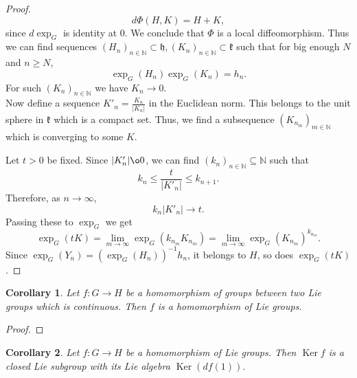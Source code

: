 \documentclass{article}
\newtheorem{corollary}{Corollary}[section]
\numberwithin{equation}{section}
\DeclareMathOperator{\Ker}{Ker}
\begin{document}
\begin{proof}
\begin{equation*}
d\Phi(H,K) = H+K,
\end{equation*}
since $d\exp_G$ is identity at $0$. We conclude that $\Phi$ is a local diffeomorphism. Thus we can find sequences $(H_n)_{n\in\mathbb{N}}\subset\mathfrak{h} ,(K_n)_{n\in\mathbb{N}}\subset\mathfrak{k}$ such that for big enough $N$ and $n\geq N$,
\begin{equation*}
\exp_G(H_n)\exp_G(K_n) = h_n.
\end{equation*}
For such $(K_n)_{n\in\mathbb{N}}$ we have $K_n\to 0$.\\%
Now define a sequence $K'_n = {\frac {K_n} {|K_n|}}$ in the Euclidean norm. This belongs to the unit sphere in $\mathfrak{k}$ which is a compact set. Thus, we find a subsequence $(K_{n_m})_{m\in\mathbb{N}}$ which is converging to some $K$.
\par Let $t>0$ be fixed. Since $|K'_n|\o 0$, we can find $(k_n)_{n\in\mathbb{N}}\subseteq\mathbb{N}$ such that
\begin{equation*}
k_n\leq {\frac t {|K'_n|}}\leq k_{n+1}.
\end{equation*}
Therefore, as $n\to\infty$, 
\begin{equation*}
k_n|K'_n|\to t.
\end{equation*}
Passing these to $\exp_G$ we get
\begin{equation*}
\exp_G(tK) = \lim_{m\to\infty}\exp_G(k_{n_m}K_{n_m}) = \lim_{m\to\infty}\exp_G(K_{n_m})^{k_{n_m}}.
\end{equation*}
Since $\exp_G(Y_n)=(\exp_G(H_n))^{-1}h_n$, it belongs to $H$, so does $\exp_G(tK)$.
\end{proof}
\begin{corollary}
Let $f:G\to H$ be a homomorphism of groups between two Lie groups which is continuous. Then $f$ is a homomorphism of Lie groups.
\end{corollary}

\begin{proof}
\end{proof}

\begin{corollary}
Let $f:G\to H$ be a homomorphism of Lie groups. Then $\Ker f$ is a closed Lie subgroup with its Lie algebra $\Ker(df(1))$.
\label{kernel_lie_subgroup}
\end{corollary}
\end{document}
